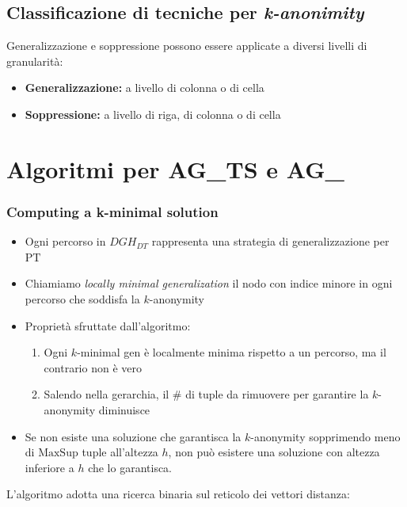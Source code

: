 \documentclass{report}
\begin{document}
\subsection{Classificazione di tecniche per \textit{k-anonimity}}
Generalizzazione e soppressione possono essere applicate a diversi
livelli di granularità:
\begin{itemize}
    \item \textbf{Generalizzazione:} a livello di colonna o di cella
    \item \textbf{Soppressione:} a livello di riga, di colonna o di cella
\end{itemize}

\newpage
\section{Algoritmi per AG\_TS e AG\_}
\subsubsection{Computing a k-minimal solution}

\begin{itemize}
    \item Ogni percorso in $ DGH_{DT} $ rappresenta una strategia di generalizzazione per \( \text{PT} \)
    \item Chiamiamo \textit{locally minimal generalization} il nodo con indice minore in ogni percorso che soddisfa la \( k \)-anonymity
    \item Proprietà sfruttate dall'algoritmo:
    \begin{enumerate}
        \item Ogni \( k \)-minimal gen è localmente minima rispetto a un percorso, ma il contrario non è vero
        \item Salendo nella gerarchia, il \# di tuple da rimuovere per garantire la \( k \)-anonymity diminuisce
    \end{enumerate}
    \item Se non esiste una soluzione che garantisca la \( k \)-anonymity sopprimendo meno di \( \text{MaxSup} \) tuple all'altezza \( h \), non può esistere una soluzione con altezza inferiore a \( h \) che lo garantisca.
\end{itemize}

\noindent L'algoritmo adotta una ricerca binaria sul reticolo dei vettori distanza:
\end{document}
